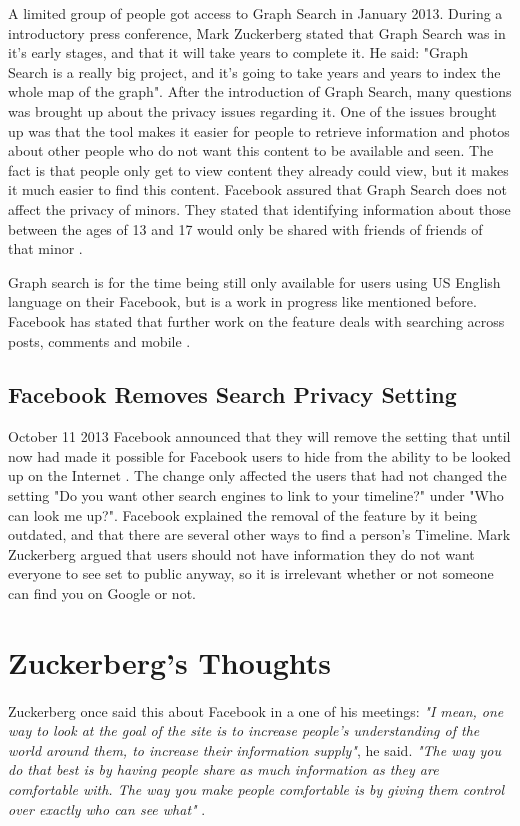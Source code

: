 A limited group of people got access to Graph Search in January 2013. During a introductory press conference, Mark Zuckerberg stated that Graph Search was in it's early stages, and that it will take years to complete it. He said: "Graph Search is a really big project, and it's going to take years and years to index the whole map of the graph". After the introduction of Graph Search, many questions was brought up about the privacy issues regarding it. One of the issues brought up was that the tool makes it easier for people to retrieve information and photos about other people who do not want this content to be available and seen. The fact is that people only get to view content they already could view, but it makes it much easier to find this content. Facebook  assured that Graph Search does not affect the privacy of minors. They stated that identifying information about those between the ages of 13 and 17 would only be shared with friends of friends of that minor \cite{graphsearchcw}. 

Graph search is for the time being still only available for users using US English language on their Facebook, but is a work in progress like mentioned before. Facebook has stated that further work on the feature deals with searching across posts, comments and mobile \cite{graphsearchcw}. 


\subsection{Facebook Removes Search Privacy Setting}
October 11 2013 Facebook announced that they will remove the setting that until now had made it possible for Facebook users to hide from the ability to be looked up on the Internet \cite{searchSetting}. The change only affected the users that had not changed the setting "Do you want other search engines to link to your timeline?" under "Who can look me up?". Facebook explained the removal of the feature by it being outdated, and that there are several other ways to find a person's Timeline. Mark Zuckerberg argued that users should not have information they do not want everyone to see set to public anyway, so it is irrelevant whether or not someone can find you on Google or not. 
 

\section{Zuckerberg's Thoughts}

\paragraph{}
Zuckerberg once said this about Facebook in a one of his meetings: \textit{"I mean, one way to look at the goal of the site is to increase people’s understanding of the world around them, to increase their information supply"}, he said. \textit{"The way you do that best is by having people share as much information as they are comfortable with. The way you make people comfortable is by giving them control over exactly who can see what"} \cite{MeMedia}.

